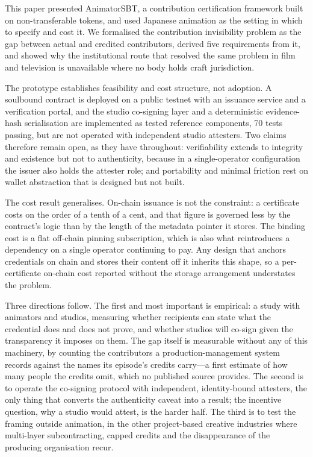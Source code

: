 
This paper presented AnimatorSBT, a contribution certification framework built on
non-transferable tokens, and used Japanese animation as the setting in which to specify
and cost it. We formalised the contribution invisibility problem as the gap between actual
and credited contributors, derived five requirements from it, and showed why the
institutional route that resolved the same problem in film and television is unavailable
where no body holds craft jurisdiction.

The prototype establishes feasibility and cost structure, not adoption. A soulbound
contract is deployed on a public testnet with an issuance service and a verification
portal, and the studio co-signing layer and a deterministic evidence-hash serialisation
are implemented as tested reference components, 70 tests passing, but are not operated
with independent studio attesters. Two claims therefore remain open, as they have
throughout: verifiability extends to integrity and existence but not to authenticity,
because in a single-operator configuration the issuer also holds the attester role; and
portability and minimal friction rest on wallet abstraction that is designed but not
built.

The cost result generalises. On-chain issuance is not the constraint: a certificate costs
on the order of a tenth of a cent, and that figure is governed less by the contract's logic
than by the length of the metadata pointer it stores. The binding cost is a flat off-chain
pinning subscription, which is also what reintroduces a dependency on a single operator
continuing to pay. Any design that anchors credentials on chain and stores their content
off it inherits this shape, so a per-certificate on-chain cost reported without the storage
arrangement understates the problem.

Three directions follow. The first and most important is empirical: a study with
animators and studios, measuring whether recipients can state what the credential does and
does not prove, and whether studios will co-sign given the transparency it imposes on
them. The gap itself is measurable without any of this machinery, by counting the
contributors a production-management system records against the names its episode's
credits carry---a first estimate of how many people the credits omit, which no published
source provides. The second is to operate the co-signing protocol with independent,
identity-bound attesters, the only thing that converts the authenticity caveat into a
result; the incentive question, why a studio would attest, is the harder half. The third
is to test the framing outside animation, in the other project-based creative industries
where multi-layer subcontracting, capped credits and the disappearance of the producing
organisation recur.

